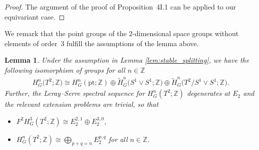 \documentclass[pdftex]{sigma}
\newtheorem{lem}[thm]{Lemma}
\theoremstyle{definition}
\newcommand{\Z}{\mathbb{Z}}
\newcommand{\pt}{\mathrm{pt}}
\begin{document}
\begin{proof}
The argument of the proof of Proposition~4I.1 \cite[p.~467]{Ha} can be applied to our equivariant case.
\end{proof}

We remark that the point groups of the $2$-dimensional space groups without elements of order~$3$ fulf\/ill the assumptions of the lemma above.

\begin{lem} \label{lem:equiv_coh_splitting_case}
Under the assumption in Lemma {\rm \ref{lem:stable_splitting}}, we have the following isomorphism of groups for all $n \in \Z$
\begin{gather*}
H^n_G\big(T^2; \Z\big) \cong H^n_G(\pt; \Z) \oplus \tilde{H}^n_G\big(S^1 \vee S^1; \Z\big) \oplus \tilde{H}^n_G\big(T^2/S^1 \vee S^1; \Z\big).
\end{gather*}
Further, the Leray--Serre spectral sequence for $H^n_G(T^2; \Z)$ degenerates at $E_2$ and the relevant extension problems are trivial, so that
\begin{itemize}\itemsep=0pt
\item[$(a)$] $F^2H^3_G(T^2; \Z) \cong E_2^{2, 1} \oplus E_2^{3, 0}$,

\item[$(b)$] $H^n_G(T^2; \Z) \cong \bigoplus_{p + q = n} E_2^{p, q}$ for all $n \in \Z$.
\end{itemize}
\end{lem}
\end{document}
